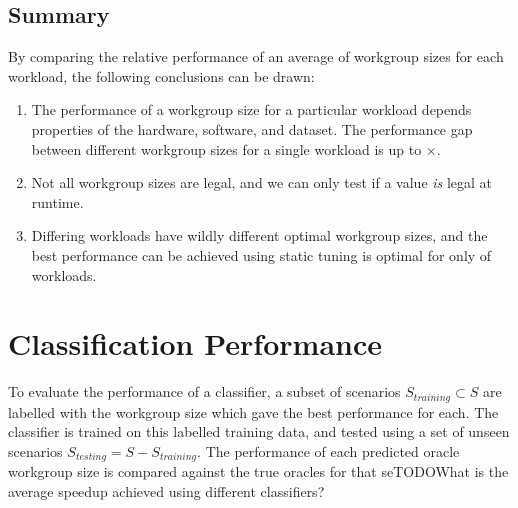 \subsection{Summary}

By comparing the relative performance of an average of
 workgroup sizes for each workload, the
following conclusions can be drawn:

\begin{enumerate}
\item The performance of a workgroup size for a particular workload
  depends properties of the hardware, software, and dataset. The
  performance gap between different workgroup sizes for a single
  workload is up to $\times$.
\item Not all workgroup sizes are legal, and we can only test if a
  value \emph{is} legal at runtime.
\item Differing workloads have wildly different optimal workgroup
  sizes, and the best performance can be achieved using static tuning
  is optimal for only  of
  workloads.
\end{enumerate}



\section{Classification Performance}


To evaluate the performance of a classifier, a subset of scenarios
$S_{training} \subset S$ are labelled with the workgroup size which
gave the best performance for each. The classifier is trained on this
labelled training data, and tested using a set of unseen scenarios
$S_{testing} = S - S_{training}$. The performance of each predicted
oracle workgroup size is compared against the true oracles for that
seTODO{What is the average speedup achieved using different
  classifiers?}



